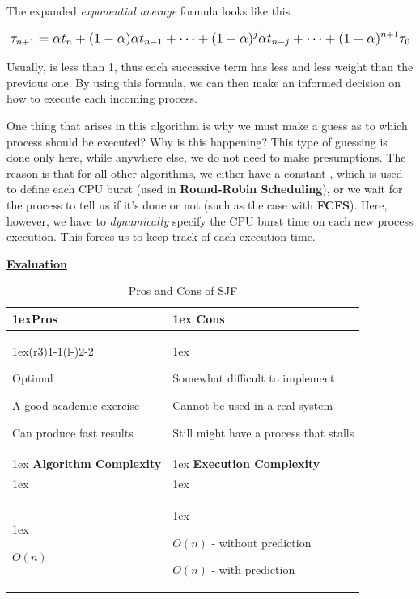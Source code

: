 \documentclass{article}
\newcommand{\code}[1]{\codeinline{\texttt{#1}}}
\begin{document}
The expanded \textit{exponential average} formula looks like this

\begin{equation}
  \mathlarger{\tau_{n+1} = \alpha t_{n} + (1 - \alpha)\alpha t_{n - 1} + \dots + (1 - \alpha)^{j} \alpha t_{n - j} + \dots + (1 - \alpha)^{n + 1} \tau_{0}}
\end{equation}

Usually, \scalebox{1.1}{\(\alpha\)} is less than 1, thus each successive term has less and less weight than the previous one. By using this formula, we can then make an informed decision on how to execute each incoming process.

One thing that arises in this algorithm is why we must make a guess as to which process should be executed? Why is this happening? This type of guessing is done only here, while anywhere else, we do not need to make presumptions. The reason is that for all other algorithms, we either have a constant \code{TIME\_QUANTUM}, which is used to define each CPU burst (used in \textbf{Round-Robin Scheduling}), or we wait for the process to tell us if it's done or not (such as the case with \textbf{FCFS}). Here, however, we have to \textit{dynamically} specify the CPU burst time on each new process execution. This forces us to keep track of each execution time.

\bigskip

\underline{\textbf{Evaluation}}

\begin{table}[H]
  \begin{tabularx}{\linewidth}{>{\parskip1ex}X@{\kern4\tabcolsep}>{\parskip1ex}X}
    \toprule
    \hfil\bfseries Pros & \hfil\bfseries Cons \\
    \cmidrule(r{3\tabcolsep}){1-1}\cmidrule(l{-\tabcolsep}){2-2}

    Optimal\par
    A good academic exercise\par
    Can produce fast results\par

    &

    Somewhat difficult to implement\par
    Cannot be used in a real system\par
    Still might have a process that stalls \\
    \bottomrule
    \toprule
    \hfil\bfseries Algorithm Complexity & \hfil\bfseries Execution Complexity \\

    \\
    \centerline{$O(n)$}\par

    &

    \centerline{$O(n)$ - without prediction}
    \centerline{$O(n)$ - with prediction}
  \end{tabularx}
  \caption{Pros and Cons of SJF}
\end{table}
\end{document}
